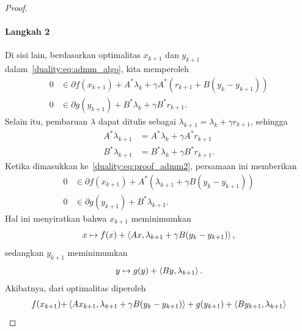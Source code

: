 \begin{proof}
    \paragraph{Langkah 2}
    Di sisi lain, berdasarkan optimalitas $x_{k+1}$ dan $y_{k+1}$ dalam~\eqref{duality:eq:admm_algo}, kita memperoleh
    \begin{equation}\label{duality:eq:proof_admm2}
        \begin{aligned}
            0 &\in \partial f(x_{k+1}) + A^*\lambda_k + \gamma A^*(r_{k+1} + B(y_k-y_{k+1}))\\
            0 &\in \partial g(y_{k+1}) + B^*\lambda_k + \gamma B^*r_{k+1}.
        \end{aligned}
    \end{equation}
    Selain itu, pembaruan $\lambda$ dapat ditulis sebagai $\lambda_{k+1} = \lambda_k + \gamma r_{k+1}$, sehingga
    \begin{equation}
        \begin{aligned}
            A^* \lambda_{k+1} &= A^*\lambda_k + \gamma A^*r_{k+1}\\
            B^* \lambda_{k+1} &= B^*\lambda_k + \gamma B^*r_{k+1}.
        \end{aligned}
    \end{equation}
    Ketika dimasukkan ke~\eqref{duality:eq:proof_admm2}, persamaan ini memberikan
    \begin{equation}
        \begin{aligned}
            0 &\in \partial f(x_{k+1}) + A^*(\lambda_{k+1} + \gamma B(y_k-y_{k+1}))\\
            0 &\in \partial g(y_{k+1}) + B^*\lambda_{k+1}.
        \end{aligned}
    \end{equation}
    Hal ini menyiratkan bahwa $x_{k+1}$ meminimumkan
    \begin{equation}
        x\mapsto f(x) + \left\langle A x , \lambda_{k+1} + \gamma B(y_k-y_{k+1})\right\rangle,
    \end{equation}
    sedangkan $y_{k+1}$ meminimumkan
    \begin{equation}
        y\mapsto g(y) + \left\langle By , \lambda_{k+1}\right\rangle.
    \end{equation}
    Akibatnya, dari optimalitas diperoleh
    \begin{equation}
        \begin{aligned}
            f(x_{k+1}) + &\inner{A x_{k+1}}{\lambda_{k+1} + \gamma B(y_k-y_{k+1})} + g(y_{k+1}) + \inner{By_{k+1}}{\lambda_{k+1}}\\

\end{aligned}
\end{equation}
\end{proof}
